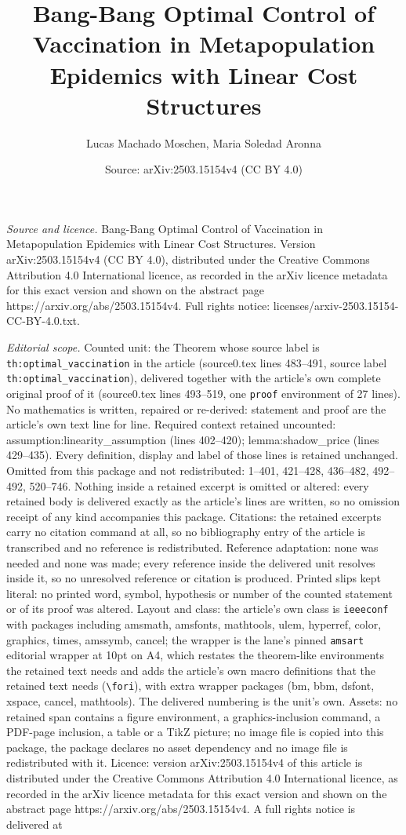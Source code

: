 \documentclass[10pt,a4paper]{amsart}
\title[Bang-Bang Optimal Control of Vaccination in Metapopulation E]{Bang-Bang Optimal Control of Vaccination in Metapopulation Epidemics with Linear Cost Structures}
\author{Lucas Machado Moschen, Maria Soledad Aronna}
\date{Source: arXiv:2503.15154v4 (CC BY 4.0)}
\begin{document}
\maketitle

\noindent\emph{Source and licence.} Bang-Bang Optimal Control of Vaccination in Metapopulation Epidemics with Linear Cost Structures. Version arXiv:2503.15154v4 (CC BY 4.0), distributed under the Creative Commons Attribution 4.0 International licence, as recorded in the arXiv licence metadata for this exact version and shown on the abstract page https://arxiv.org/abs/2503.15154v4. Full rights notice: licenses/arxiv-2503.15154-CC-BY-4.0.txt.\par\smallskip

\noindent\textit{Editorial scope.} Counted unit: the Theorem whose source label is \texttt{th:optimal\_vaccination} in the article (source0.tex lines 483--491, source label \texttt{th:optimal\_vaccination}), delivered together with the article's own complete original proof of it (source0.tex lines 493--519, one \texttt{proof} environment of 27 lines). No mathematics is written, repaired or re-derived: statement and proof are the article's own text line for line. Required context retained uncounted: assumption:linearity\_assumption (lines 402--420); lemma:shadow\_price (lines 429--435). Every definition, display and label of those lines is retained unchanged. Omitted from this package and not redistributed: 1--401, 421--428, 436--482, 492--492, 520--746. Nothing inside a retained excerpt is omitted or altered: every retained body is delivered exactly as the article's lines are written, so no omission receipt of any kind accompanies this package. Citations: the retained excerpts carry no citation command at all, so no bibliography entry of the article is transcribed and no reference is redistributed. Reference adaptation: none was needed and none was made; every reference inside the delivered unit resolves inside it, so no unresolved reference or citation is produced. Printed slips kept literal: no printed word, symbol, hypothesis or number of the counted statement or of its proof was altered. Layout and class: the article's own class is \texttt{ieeeconf} with packages including amsmath, amsfonts, mathtools, ulem, hyperref, color, graphics, times, amssymb, cancel; the wrapper is the lane's pinned \texttt{amsart} editorial wrapper at 10pt on A4, which restates the theorem-like environments the retained text needs and adds the article's own macro definitions that the retained text needs (\texttt{\textbackslash fori}), with extra wrapper packages (bm, bbm, dsfont, xspace, cancel, mathtools). The delivered numbering is the unit's own. Assets: no retained span contains a figure environment, a graphics-inclusion command, a PDF-page inclusion, a table or a TikZ picture; no image file is copied into this package, the package declares no asset dependency and no image file is redistributed with it. Licence: version arXiv:2503.15154v4 of this article is distributed under the Creative Commons Attribution 4.0 International licence, as recorded in the arXiv licence metadata for this exact version and shown on the abstract page https://arxiv.org/abs/2503.15154v4. A full rights notice is delivered at 
\end{document}
